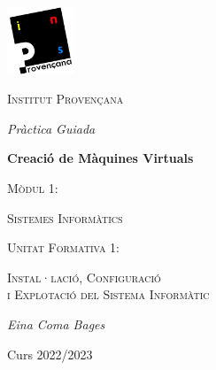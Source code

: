 \begin{titlepage}
	\centering
	\includegraphics*[width=0.15\textwidth]{provencana_color.pdf}
	\par\vspace{0.5cm}

	{\scshape\Large Institut Provençana \par}

	\vspace{1cm}
	
	{\itshape\Large Pràctica Guiada \par}
	{\bfseries\LARGE Creació de Màquines Virtuals \par}
	
	\vspace{1cm}

	{\scshape\large Mòdul 1: \par}
	{\scshape\Large Sistemes Informàtics \par}

	\vspace{0.5cm}
	
	{\scshape\normalsize Unitat Formativa 1: \par}
	{\scshape\large Instal·lació, Configuració \\ i Explotació del Sistema Informàtic\par}

	\vfill
	{\Large\itshape Eina Coma Bages\par}
	
	\vfill
	Curs 2022/2023
\end{titlepage}